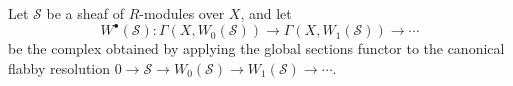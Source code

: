 Let $\mathcal{S}$ be a sheaf of $R$-modules over $X$, and let
$$W^\bullet(\mathcal{S}): \Gamma(X, W_0(\mathcal{S})) \rightarrow \Gamma(X, W_1(\mathcal{S})) \rightarrow \cdots$$
be the complex obtained by applying the global sections functor to the canonical flabby resolution $0 \to \mathcal{S} \to W_0(\mathcal{S}) \to W_1(\mathcal{S}) \to \cdots$.

